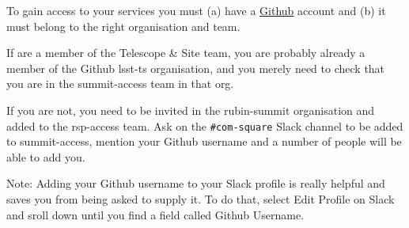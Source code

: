 To gain access to your services you must (a) have a \href{https://github.com}{Github} account and (b) it must belong to the right organisation and team.

If are a member of the Telescope \& Site team, you are probably already a member of the Github lsst-ts organisation, and you merely need to check that you are in the summit-access team in that org.

If you are not, you need to be invited in the rubin-summit organisation and added to the rsp-access team. Ask on the \verb|#com-square| Slack channel to be added to summit-access, mention your Github username and a number of people will be able to add you.

Note: Adding your Github username to your Slack profile is really helpful and saves you from being asked to supply it. To do that, select Edit Profile on Slack and sroll down until you find a field called Github Username.
